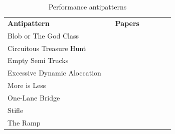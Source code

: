 \documentclass{report}
\begin{document}
\begin{table}[]
\centering
\caption{Performance antipatterns}
\label{antipatterns}
\begin{tabular}{|l|l|l|llll}
\cline{1-3}
\multicolumn{2}{|l|}{\cellcolor[HTML]{C0C0C0}\textbf{Antipattern}}     & \cellcolor[HTML]{C0C0C0}\textbf{Papers}                                                                        &  &  &  &  \\ \cline{1-3}
Blob or The God Class                   &                              & \cite{Wert2014} \cite{Smith2000} \cite{Trubiani2011} \cite{Vetoio2011} \cite{Cortellessa2007} \cite{Smith2003} &  &  &  &  \\ \cline{1-1} \cline{3-3}
Circuitous Treasure Hunt                &                              & \cite{Wert2014} \cite{Trubiani2011} \cite{Vetoio2011} \cite{Smith2003} \cite{Smith2002}                        &  &  &  &  \\ \cline{1-1} \cline{3-3}
Empty Semi Trucks                       &                              & \cite{Wert2014} \cite{Trubiani2011} \cite{Arcelli2012} \cite{Vetoio2011}                                       &  &  &  &  \\ \cline{1-1} \cline{3-3}
Excessive Dynamic Aloccation            &                              & \cite{Trubiani2011} \cite{Vetoio2011} \cite{Smith2003} \cite{Smith2002}                                        &  &  &  &  \\ \cline{1-1} \cline{3-3}
More is Less                            &                              & \cite{Vetoio2011} \cite{Trubiani2011} \cite{Smith2003}                                                         &  &  &  &  \\ \cline{1-1} \cline{3-3}
One-Lane Bridge                         &                              & \cite{Vetoio2011} \cite{Trubiani2011} \cite{Smith2003} \cite{Smith2002}                                        &  &  &  &  \\ \cline{1-1} \cline{3-3}
Stifle                                  &                              & \cite{Wert2014}                                                                                                &  &  &  &  \\ \cline{1-1} \cline{3-3}
The Ramp                                &                              & \cite{Trubiani2011} \cite{Vetoio2011} \cite{Smith2003}                                                         &  &  &  &  \\ \cline{1-1} \cline{3-3}

\end{tabular}
\end{table}
\end{document}
